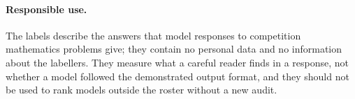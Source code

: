 \paragraph{Responsible use.}
The labels describe the answers that model responses to competition mathematics problems give; they
contain no personal data and no information about the labellers. They measure what a careful reader
finds in a response, not whether a model followed the demonstrated output format, and they should not
be used to rank models outside the roster without a new audit.
